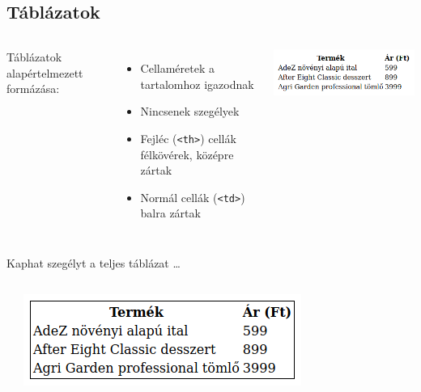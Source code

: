 \subsection{Táblázatok}

\begin{frame}
  \begin{columns}[c]
      Táblázatok alapértelmezett formázása:
      \begin{itemize}
        \item Cellaméretek a tartalomhoz igazodnak
        \item Nincsenek szegélyek
        \item Fejléc (\texttt{<th>}) cellák félkövérek, középre zártak
        \item Normál cellák (\texttt{<td>}) balra zártak
      \end{itemize}
        \begin{exampleblock}{}
          \begin{center}
            \includegraphics[width=\textwidth]{tablazat01.png}
          \end{center}
        \end{exampleblock}
  \end{columns}
\end{frame}

\begin{frame}
  Kaphat szegélyt a teljes táblázat \dots
  \begin{columns}[c]
      \begin{exampleblock}{}
        \scriptsize
        
        
      \end{exampleblock}
      \includegraphics[width=\textwidth]{tablazat02.png}
  \end{columns}
\end{frame}

